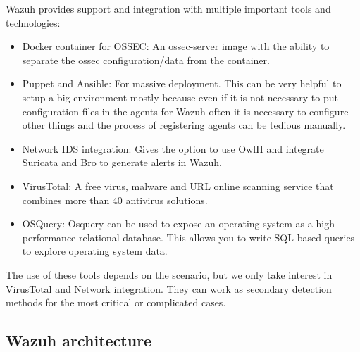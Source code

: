 \linej
\linej
Wazuh provides support and integration with multiple important tools and technologies:
\begin{itemize}
	\item Docker container for OSSEC: An ossec-server image with the ability to separate the ossec configuration/data from the container.
	\item Puppet and Ansible: For massive deployment. This can be very helpful to setup a big environment mostly because even if it is not necessary to put configuration files in the agents for Wazuh often it is necessary to configure other things and the process of registering agents can be tedious manually.
	\item Network IDS integration: Gives the option to use OwlH and integrate Suricata and Bro to generate alerts in Wazuh.
	\item VirusTotal: A free virus, malware and URL online scanning service that combines more than 40 antivirus solutions.
	\item OSQuery: Osquery can be used to expose an operating system as a high-performance relational database. This allows you to write SQL-based queries to explore operating system data.
\end{itemize}
\linej
The use of these tools depends on the scenario, but we only take interest in VirusTotal and Network integration. They can work as secondary detection methods for the most critical or complicated cases.

\subsection{Wazuh architecture}

